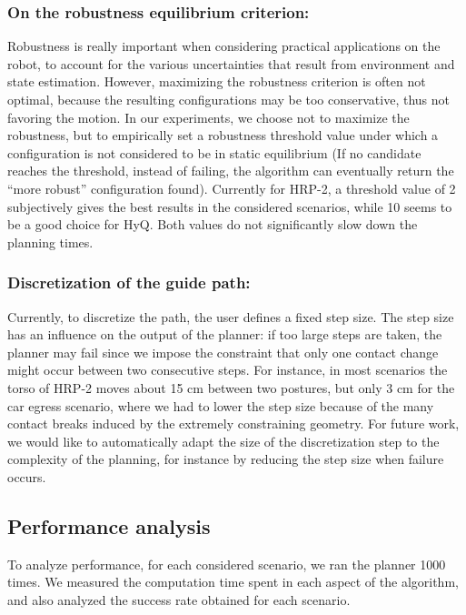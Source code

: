 \subsubsection{On the robustness equilibrium criterion:} \label{sec:parrob}
Robustness is really important when considering practical applications on the robot, to account 
for the various uncertainties that result from environment and state estimation. However,
maximizing the robustness criterion is often not optimal, because the resulting configurations may be too conservative, thus not favoring the motion. In our experiments, we choose not to maximize the robustness,
but to empirically set a robustness threshold value under which a configuration is not considered to be in
static equilibrium (If no candidate reaches the threshold, instead of failing, the algorithm can eventually return the ``more robust'' configuration
found). Currently for HRP-2, a threshold value of 2 subjectively gives the best results in the considered scenarios, while 10 seems to be a good choice for HyQ. Both values do not
significantly slow down the planning times.

\subsubsection{Discretization of the guide path:} \label{sec:disc}
Currently, to discretize the path, the user defines a fixed step size. The step size
has an influence on the output of the planner: if too large steps are taken,
the planner may fail since we impose the constraint that only one contact change might occur
between two consecutive steps. For instance, in most scenarios the torso of HRP-2 moves about 15 cm between two postures, but only 3 cm
for the car egress scenario, where we had to lower the step size because of the many contact breaks induced by the extremely constraining geometry.
For future work, we would like to automatically adapt the size of the discretization step to the complexity of the planning, for instance
by reducing the step size when failure occurs.

\subsection{Performance analysis} \label{sec:perf}
To analyze performance, for each considered scenario, we ran the planner 1000 times.
We measured the computation time spent in each aspect of the algorithm, and also analyzed the success
rate obtained for each scenario.


